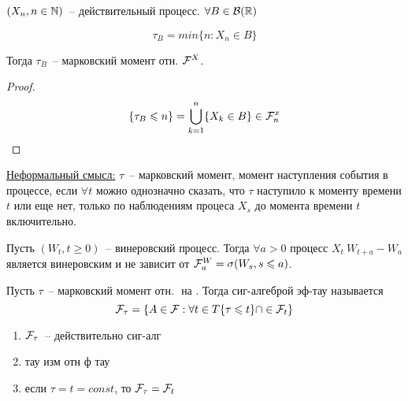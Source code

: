 \begin{example}
$(X_n, n \in \mathbb{N})$~-- действительный процесс. $\forall B \in \mathcal{B}(\mathbb{R})$

$$\tau_B = min\{n: X_n \in B\}$$

Тогда $\tau_B$~-- марковский момент отн. $\mathcal{F}^X$.
\end{example}
\begin{proof}
$$\{\tau_B \leqslant n\} = \bigcup_{k = 1}^{n}\{X_k \in B\} \in \mathcal{F}_n^x$$
\end{proof}

\underline{Неформальный смысл:} $\tau$~-- марковский момент, момент наступления
события в процессе, если $\forall t$ можно однозначно сказать, что $\tau$ наступило
к моменту времени $t$ или еще нет, только по наблюдениям процеса $X_s$ до момента времени
$t$ включительно.

\begin{theorem}
Пусть $(W_t, t \geq 0)$~-- винеровский процесс. Тогда
$\forall a > 0$ процесс $X_t \ W_{t+a} - W_a$ является винеровским и
не зависит от $\mathcal{F}_a^W = \sigma(W_s, s \leqslant a)$.
\end{theorem}

\begin{definition}
Пусть $\tau$~-- марковский момент отн. $ $ на $ $. Тогда сиг-алгеброй эф-тау
называется
$$\mathcal{F}_\tau = \{A \in \mathcal{F}: \forall t \in T \{\tau \leqslant t\} \cap \in \mathcal{F}_t\}$$
\end{definition}
\begin{enumerate}
\item $\mathcal{F}_\tau$~-- действительно сиг-алг
\item тау изм отн ф тау
\item если $\tau = t = const$, то $\mathcal{F}_\tau = \mathcal{F}_t$
\end{enumerate}

